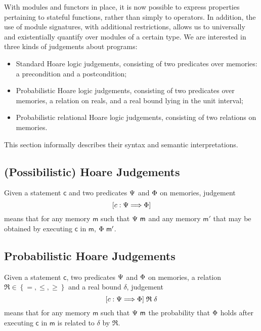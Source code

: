 With modules and functors in place, it is now possible to express properties
pertaining to stateful functions, rather than simply to operators. In addition,
the use of module signatures, with additional restrictions, allows us to
universally and existentially quantify over modules of a certain type. We are
interested in three kinds of judgements about programs:
\begin{itemize}\itemsep-.5em
\item Standard Hoare logic judgements, consisting of two predicates over
  memories: a precondition and a postcondition;
\item Probabilistic Hoare logic judgements, consisting of two predicates over
  memories, a relation on reals, and a real bound lying in the unit interval;
\item Probabilistic relational Hoare logic judgements, consisting of two
  relations on memories.
\end{itemize}
This section informally describes their syntax and semantic interpretations.


\subsection{(Possibilistic) Hoare Judgements}
Given a statement $\mathsf{c}$ and two predicates $\Psi$ and $\Phi$ on
memories, judgement \[\left[{c}:{\Psi}\Longrightarrow{\Phi}\right]\] means that for any memory
$\mathsf{m}$ such that $\Psi\ \mathsf{m}$ and any memory $\mathsf{m'}$ that may
be obtained by executing $\mathsf{c}$ in $\mathsf{m}$, $\Phi\ \mathsf{m'}$.


\subsection{Probabilistic Hoare Judgements}
Given a statement $\mathsf{c}$, two predicates $\Psi$ and $\Phi$ on
memories, a relation $\mathfrak{R} \in \left\{=,\leq,\geq\right\}$ and a real bound $\delta$,
judgement \[\left[{c}:{\Psi}\Longrightarrow{\Phi}\right] \mathrel{\mathfrak{R}} \delta\] means that for
any memory $\mathsf{m}$ such that $\Psi\ \mathsf{m}$ the probability that
$\Phi$ holds after executing $\mathsf{c}$ in $\mathsf{m}$ is related to
$\delta$ by $\mathfrak{R}$.


